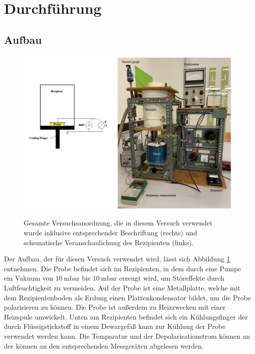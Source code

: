 
\section{Durchführung}
\label{sec:Durchführung}
\subsection{Aufbau}
\begin{figure}
\centering
\includegraphics[width=\textwidth,keepaspectratio]{Dipolrelaxation Versuchsanordnung}
\label{fig:Versuchsanordnung}
\caption{Gesamte Versuchsanordnung, die in diesem Versuch verwendet wurde inklusive entsprechender Beschriftung (rechts) und schematische Veranschaulichung  des Rezipienten (links).}
\end{figure}
Der Aufbau, der für diesen Versuch verwendet wird, lässt sich Abbildung \ref{fig:Versuchsanordnung} entnehmen. Die Probe befindet sich im Rezipienten, in dem durch eine Pumpe ein Vakuum von $\SI{10}{\milli\bar}$ bis $\SI{10}{\milli\bar}$ erzeugt wird, um Störeffekte durch Luftfeuchtigkeit zu vermeiden.
Auf der Probe ist eine Metallplatte, welche mit dem Rezipientenboden als Erdung einen Plattenkondensator bildet, um die Probe polarisieren zu können. Die Probe ist außerdem zu Heizzwecken mit einer Heizspule umwickelt. Unten am Rezipienten befindet sich ein Kühlungsfinger der durch Flüssigstickstoff in einem Dewargefäß kann zur Kühlung der Probe verwendet werden kann. Die Temparatur und der Depolarisationstrom können an der können an den entsprechenden Messgeräten abgelesen werden.
